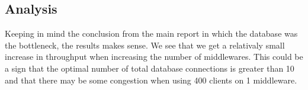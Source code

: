 \documentclass[a4paper, 11pt]{article}
\begin{document}
\subsection{Analysis}
Keeping in mind the conclusion from the main report in which the database was the bottleneck, the results makes sense. We see that we get a relativaly small increase in throughput when increasing the number of middlewares. This could be a sign that the optimal number of total database connections is greater than 10 and that there may be some congestion when using 400 clients on 1 middleware.\\
\end{document}
